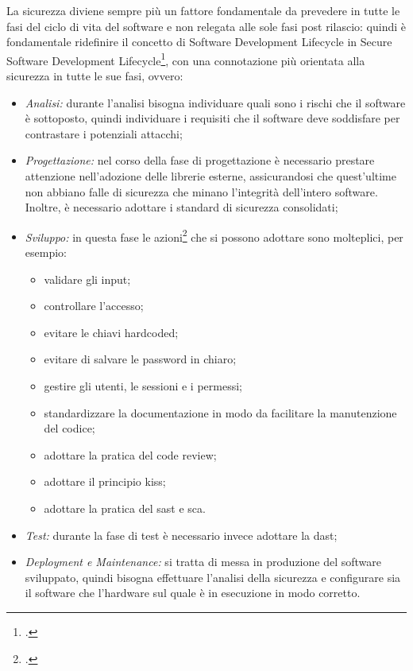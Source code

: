 La sicurezza diviene sempre più un fattore fondamentale da prevedere in tutte le fasi del ciclo di vita del software e non relegata alle sole fasi post rilascio: quindi è fondamentale ridefinire il concetto di Software Development Lifecycle in Secure Software Development Lifecycle\footcite{site:ssdl}, con una connotazione più orientata alla sicurezza in tutte le sue fasi, ovvero:
\begin{itemize}
    \item \textit{Analisi:} durante l'analisi bisogna individuare quali sono i rischi che il software è sottoposto, quindi individuare i requisiti che il software deve soddisfare per contrastare i potenziali attacchi;
    \item \textit{Progettazione:} nel corso della fase di progettazione è necessario prestare attenzione nell'adozione delle librerie esterne, assicurandosi che quest'ultime non abbiano falle di sicurezza che minano l'integrità dell'intero software.
    Inoltre, è necessario adottare i standard di sicurezza consolidati;
    \item \textit{Sviluppo:} in questa fase le azioni\footcite{site:security-best-practice} che si possono adottare sono molteplici, per esempio:
    \begin{itemize}
        \item validare gli input;
        \item controllare l'accesso;
        \item evitare le chiavi hardcoded;
        \item evitare di salvare le password in chiaro;
        \item gestire gli utenti, le sessioni e i permessi;
        \item standardizzare la documentazione in modo da facilitare la manutenzione del codice;
        \item adottare la pratica del code review;
        \item adottare il principio \gls{kiss};
        \item adottare la pratica del \gls{sast} e \gls{sca}.
    \end{itemize}
    \item \textit{Test:} durante la fase di test è necessario invece adottare la \gls{dast};
    \item \textit{Deployment e Maintenance:} si tratta di messa in produzione del software sviluppato, quindi bisogna effettuare l'analisi della sicurezza e configurare sia il software che l'hardware sul quale è in esecuzione in modo corretto.
\end{itemize}

